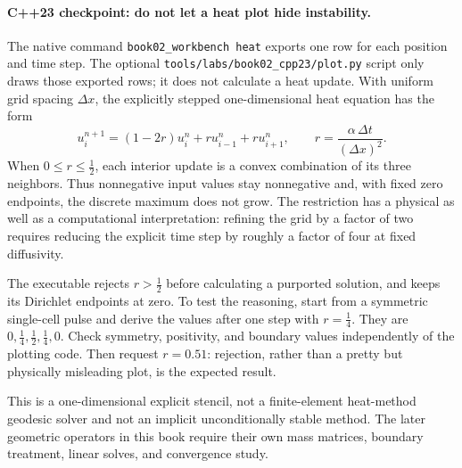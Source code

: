 \paragraph{C++23 checkpoint: do not let a heat plot hide instability.}
The native command \texttt{book02\_workbench heat} exports one row for
each position and time step. The optional
\texttt{tools/labs/book02\_cpp23/plot.py} script only draws those
exported rows; it does not calculate a heat update. With uniform grid
spacing \(\Delta x\), the explicitly stepped one-dimensional heat
equation has the form
\[
u_i^{n+1}=(1-2r)u_i^n+r u_{i-1}^n+r u_{i+1}^n,\qquad
r=\frac{\alpha\,\Delta t}{(\Delta x)^2}.
\]
When \(0\leq r\leq\tfrac12\), each interior update is a convex
combination of its three neighbors. Thus nonnegative input values
stay nonnegative and, with fixed zero endpoints, the discrete maximum
does not grow. The restriction has a physical as well as a computational
interpretation: refining the grid by a factor of two requires reducing
the explicit time step by roughly a factor of four at fixed diffusivity.

The executable rejects \(r>\tfrac12\) before calculating a purported
solution, and keeps its Dirichlet endpoints at zero. To test the
reasoning, start from a symmetric single-cell pulse and derive the
values after one step with \(r=\tfrac14\). They are \(0,\tfrac14,
\tfrac12,\tfrac14,0\). Check symmetry, positivity, and boundary
values independently of the plotting code. Then request
\(r=0.51\): rejection, rather than a pretty but physically misleading
plot, is the expected result.

This is a one-dimensional explicit stencil, not a finite-element
heat-method geodesic solver and not an implicit unconditionally stable
method. The later geometric operators in this book require their own
mass matrices, boundary treatment, linear solves, and convergence study.
